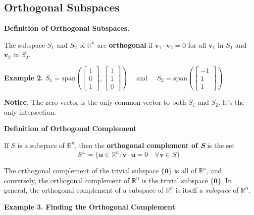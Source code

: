 \documentclass{article}
\newcommand\B{\textbf}
\newcommand\tcl{\begin{tcolorbox}[colback = {blue9}]}
\newcommand\etcl{\end{tcolorbox}}
\newcommand\R{\mathbb{R}}
\begin{document}
    \subsection{Orthogonal Subspaces}

    \tcl
    \B{Definition of Orthogonal Subspaces.} 
    
    The subspace $S_1$ and $S_2$ of $\R^n$ are \textbf{orthogonal} if $\B{v}_1 \cdot \B{v}_2 = 0$ for all $\B{v}_1$ in $S_1$ and $\B{v}_2$ in $S_2$.
    \etcl 
    \B{Example 2.} $S_1 = \text{span}\left( 
        \begin{bmatrix}
            1 \\ 0 \\ 1
        \end{bmatrix},
        \begin{bmatrix}
            1 \\ 1 \\ 0
        \end{bmatrix}
        \right) \quad \text{ and   } \quad 
        S_2 = \text{span}\left(
            \begin{bmatrix}
                -1 \\ 1 \\ 1
            \end{bmatrix}
            \right)$
    
    \B{Notice.} The zero vector is the only common vector to both $S_1$ and $S_2$. It's the only intersection.
    \tcl 
    \B{Definition of Orthogonal Complement}

    If $S$ is a subspace of $\R^n$, then the \B{orthogonal complement of \textit{S}} is the set 
    \[ S^{\perp} = \{ \B{u} \in \R^n : \B{v} \cdot \B{u} = 0 \quad \forall \B{v} \in S \} \]
    \etcl 
    The orthogonal complement of the trivial subspace $\{ \B{0} \}$ is all of $\R^n$, and conversely, the 
    orthogonal complement of $\R^n$ is the trivial subspace $\{\B{0}\}$. In general, the orthogonal complement
    of a subspace of $\R^n$ is itself a \textit{subspace} of $\R^n$.

    \B{Example 3. Finding the Orthogonal Complement}
\end{document}
